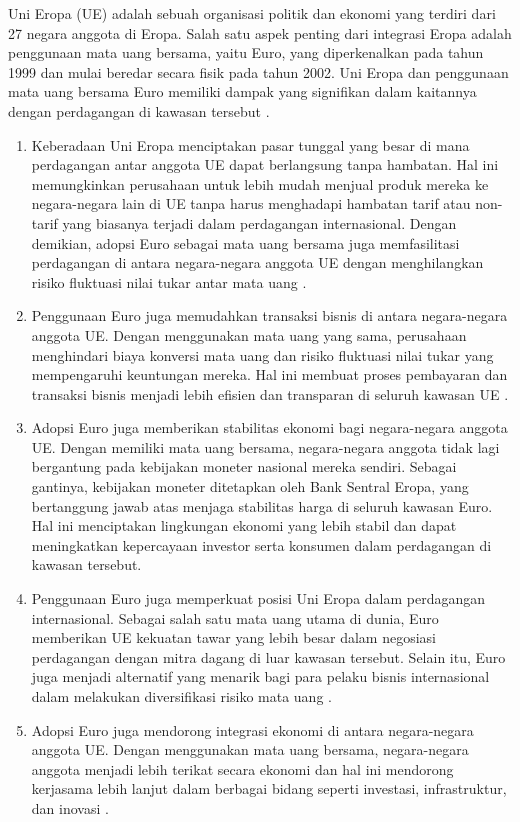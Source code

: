 \documentclass[12pt]{article}
\begin{document}
Uni Eropa (UE) adalah sebuah organisasi politik dan ekonomi yang terdiri dari 27 negara anggota di Eropa. Salah satu aspek penting dari integrasi Eropa adalah penggunaan mata uang bersama, yaitu Euro, yang diperkenalkan pada tahun 1999 dan mulai beredar secara fisik pada tahun 2002. Uni Eropa dan penggunaan mata uang bersama Euro memiliki dampak yang signifikan dalam kaitannya dengan perdagangan di kawasan tersebut \autocite{baldwin2015economics}.
\begin{enumerate}
    \item Keberadaan Uni Eropa menciptakan pasar tunggal yang besar di mana perdagangan antar anggota UE dapat berlangsung tanpa hambatan. Hal ini memungkinkan perusahaan untuk lebih mudah menjual produk mereka ke negara-negara lain di UE tanpa harus menghadapi hambatan tarif atau non-tarif yang biasanya terjadi dalam perdagangan internasional. Dengan demikian, adopsi Euro sebagai mata uang bersama juga memfasilitasi perdagangan di antara negara-negara anggota UE dengan menghilangkan risiko fluktuasi nilai tukar antar mata uang .
    \item Penggunaan Euro juga memudahkan transaksi bisnis di antara negara-negara anggota UE. Dengan menggunakan mata uang yang sama, perusahaan  menghindari biaya konversi mata uang dan risiko fluktuasi nilai tukar yang  mempengaruhi keuntungan mereka. Hal ini membuat proses pembayaran dan transaksi bisnis menjadi lebih efisien dan transparan di seluruh kawasan UE \autocite[280]{baldwin2015economics}.
    \item Adopsi Euro juga memberikan stabilitas ekonomi bagi negara-negara anggota UE. Dengan memiliki mata uang bersama, negara-negara anggota tidak lagi bergantung pada kebijakan moneter nasional mereka sendiri. Sebagai gantinya, kebijakan moneter ditetapkan oleh Bank Sentral Eropa, yang bertanggung jawab atas menjaga stabilitas harga di seluruh kawasan Euro. Hal ini menciptakan lingkungan ekonomi yang lebih stabil dan dapat meningkatkan kepercayaan investor serta konsumen dalam perdagangan di kawasan tersebut.
    \item Penggunaan Euro juga memperkuat posisi Uni Eropa dalam perdagangan internasional. Sebagai salah satu mata uang utama di dunia, Euro memberikan UE kekuatan tawar yang lebih besar dalam negosiasi perdagangan dengan mitra dagang di luar kawasan tersebut. Selain itu, Euro juga menjadi alternatif yang menarik bagi para pelaku bisnis internasional dalam melakukan diversifikasi risiko mata uang \autocite[352]{baldwin2015economics}.
    \item Adopsi Euro juga mendorong integrasi ekonomi di antara negara-negara anggota UE. Dengan menggunakan mata uang bersama, negara-negara anggota menjadi lebih terikat secara ekonomi dan hal ini mendorong kerjasama lebih   lanjut dalam berbagai bidang seperti investasi, infrastruktur, dan inovasi \autocite[40]{baldwin2015economics}.


\end{enumerate}
\end{document}

